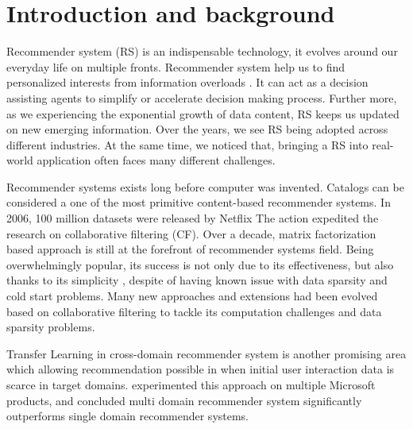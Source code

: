 
\section{Introduction and background}
Recommender system (RS) is an indispensable technology, it evolves around our everyday life on multiple fronts. Recommender system help us to find personalized interests from information overloads \citep{Lu2015}. It can act as a decision assisting agents to simplify or accelerate decision making process. Further more, as we experiencing the exponential growth of data content, RS keeps us updated on new emerging information.
Over the years, we see RS being adopted across different industries. At the same time, we noticed that, bringing a RS into real-world application often faces many different challenges. 

Recommender systems exists long before computer was invented. Catalogs can be considered a one of the most primitive content-based recommender systems. In 2006, 100 million datasets were released by Netflix \citep{Bennett2007} The action expedited the research on collaborative filtering (CF). Over a decade, matrix factorization based approach is still at the forefront of recommender systems field. Being overwhelmingly popular, its success is not only due to its effectiveness, but also thanks to its simplicity \citep{Amatriain2016}, despite of having known issue with data sparsity and cold start problems. Many new approaches and extensions had been evolved based on collaborative filtering to tackle its computation challenges and data sparsity problems. 

Transfer Learning \citep{Pan2010} in cross-domain recommender system is another promising area which allowing recommendation possible in when initial user interaction data is scarce in target domains. \citet{Elkahky2015} experimented this approach on multiple Microsoft products, and concluded multi domain recommender system significantly outperforms single domain recommender systems. 


